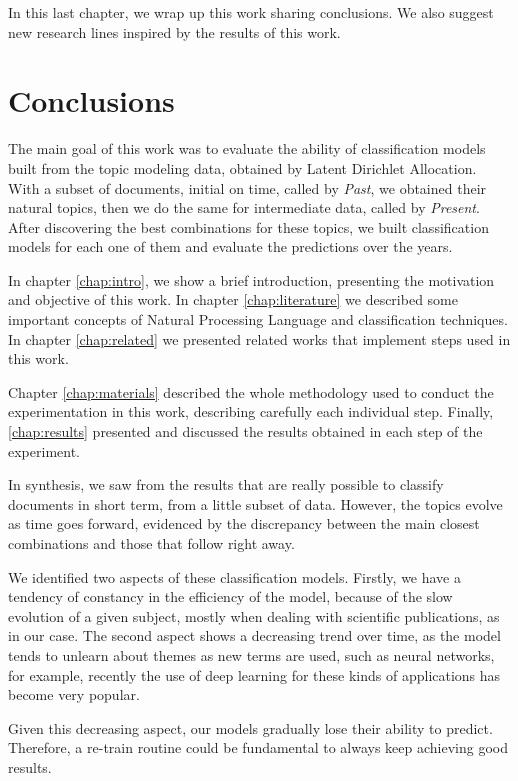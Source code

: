 In this last chapter, we wrap up this work sharing conclusions. We also suggest new research lines inspired by the results of this work.

\section{Conclusions}

The main goal of this work was to evaluate the ability of classification models built from the topic modeling data, obtained by Latent Dirichlet Allocation. With a subset of documents, initial on time, called by \textit{Past}, we obtained their natural topics, then we do the same for intermediate data, called by \textit{Present}. After discovering the best combinations for these topics, we built classification models for each one of them and evaluate the predictions over the years.

In chapter \ref{chap:intro}, we show a brief introduction, presenting the motivation and objective of this work. In chapter \ref{chap:literature} we described some important concepts of Natural Processing Language and classification techniques. In chapter \ref{chap:related} we presented related works that implement steps used in this work. 

Chapter \ref{chap:materials} described the whole methodology used to conduct the experimentation in this work, describing carefully each individual step. Finally, \ref{chap:results} presented and discussed the results obtained in each step of the experiment.

In synthesis, we saw from the results that are really possible to classify documents in short term, from a little subset of data. However, the topics evolve as time goes forward, evidenced by the discrepancy between the main closest combinations and those that follow right away.

We identified two aspects of these classification models. Firstly, we have a tendency of constancy in the efficiency of the model, because of the slow evolution of a given subject, mostly when dealing with scientific publications, as in our case. The second aspect shows a decreasing trend over time, as the model tends to unlearn about themes as new terms are used, such as neural networks, for example, recently the use of deep learning for these kinds of applications has become very popular.

Given this decreasing aspect, our models gradually lose their ability to predict. Therefore, a re-train routine could be fundamental to always keep achieving good results.

